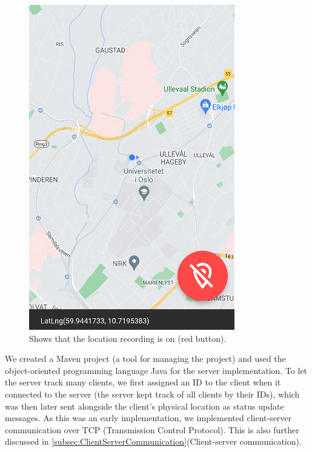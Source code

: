 \documentclass{article}
\begin{document}
\begin{figure}[H]
\begin{minipage}[c]{0.34\linewidth}
        \includegraphics[width=\linewidth]{graphics/recording_on.png}
        \caption{Shows that the location recording is on (red button).}
        \label{fig:recording_on}
    \end{minipage}
\end{figure}

We created a Maven project (a tool for managing the project) and used the object-oriented programming language Java for the server implementation. To let the server track many clients, we first assigned an ID to the client when it connected to the server (the server kept track of all clients by their IDs), which was then later sent alongside the client's physical location as status update messages. As this was an early implementation, we implemented client-server communication over TCP (Transmission Control Protocol). This is also further discussed in \ref{subsec:ClientServerCommunication}(Client-server communication).
\end{document}
